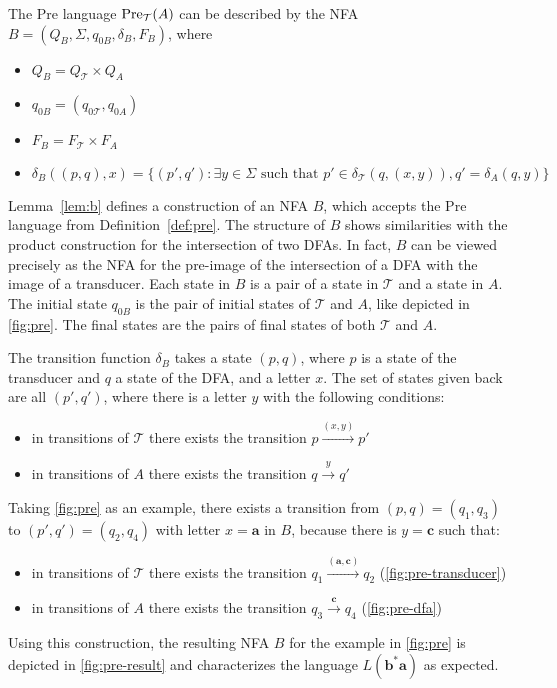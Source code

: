 \begin{lemma}\label{lem:b}
The Pre language $\operatorname{\text{Pre}}_{\mathcal{T}}(A)$ can be described by the NFA $B = (Q_{B},\Sigma,q_{0B},\delta_{B},F_{B})$, where 
\begin{itemize}[--,noitemsep]
\item $Q_{B} = Q_{\mathcal{T}} \times Q_{A}$
\item $q_{0B} = (q_{0\mathcal{T}},q_{0A})$
\item $F_{B} = F_{\mathcal{T}} \times F_{A}$
\item $\delta_{B}((p,q),x) = \{(p',q'): \exists y \in \Sigma \text{ such that } p' \in \delta_{\mathcal{T}}(q,(x,y)), q' = \delta_{A}(q,y)\}$
\end{itemize}
\end{lemma}

Lemma~\autoref{lem:b} defines a construction of an NFA $B$, which accepts the Pre language from Definition~\autoref{def:pre}. 
The structure of $B$ shows similarities with the product construction for the intersection of two DFAs. In fact, $B$ can be viewed precisely as the NFA for the pre-image of the intersection of a DFA with the image of a transducer. Each state in $B$ is a pair of a state in $\mathcal{T}$ and a state in $A$. The initial state $q_{0B}$ is the pair of initial states of $\mathcal{T}$ and $A$, like depicted in \autoref{fig:pre}. The final states are the pairs of final states of both $\mathcal{T}$ and $A$.
 
\par

The transition function $\delta_{B}$ takes a state $(p,q)$, where $p$ is a state of the transducer and $q$ a state of the DFA, and a letter $x$. The set of states given back are all $(p',q')$, where there is a letter $y$ with the following conditions:
\begin{itemize}[--,noitemsep]
\item in transitions of $\mathcal{T}$ there exists the transition $p \xrightarrow{(x,y)} p'$
\item in transitions of $A$ there exists the transition $q \xrightarrow{y} q'$
\end{itemize}

Taking \autoref{fig:pre} as an example, there exists a transition from $(p,q)=(q_{1},q_{3})$ to $(p',q')=(q_{2},q_{4})$ with letter $x=\bm{a}$ in $B$, because there is $y=\bm{c}$ such that:

\begin{itemize}[--,noitemsep]
\item in transitions of $\mathcal{T}$ there exists the transition $q_{1} \xrightarrow{(\bm{a},\bm{c})} q_{2}$ (\autoref{fig:pre-transducer})
\item in transitions of $A$ there exists the transition $q_{3} \xrightarrow{\bm{c}} q_{4}$ (\autoref{fig:pre-dfa})
\end{itemize}
Using this construction, the resulting NFA $B$ for the example in \autoref{fig:pre} is depicted in \autoref{fig:pre-result} and characterizes the language $L(\bm{b^{*}a})$ as expected.

